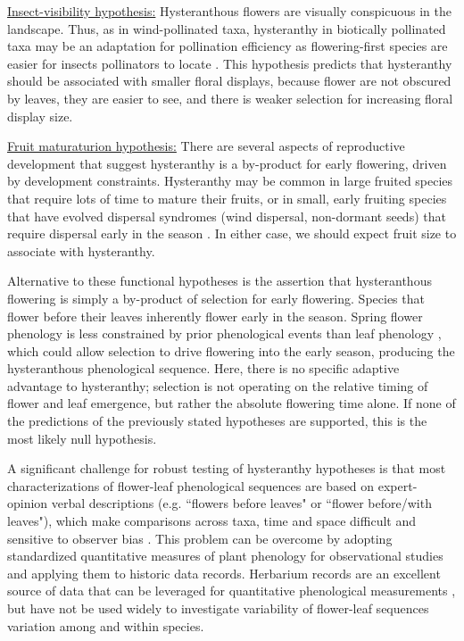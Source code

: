 \documentclass{article}[11pt]
\begin{document}
\underline{Insect-visibility hypothesis:} Hysteranthous flowers are visually conspicuous in the landscape. Thus, as in wind-pollinated taxa, hysteranthy in biotically pollinated taxa may be an adaptation for pollination efficiency as flowering-first species are easier for insects pollinators to locate \citep{Janzen1967}. This hypothesis predicts that hysteranthy should be associated with smaller floral displays, because flower are not obscured by leaves, they are easier to see, and there is weaker selection for increasing floral display size. 

\underline{Fruit maturaturion hypothesis:} There are several aspects of reproductive development that suggest hysteranthy is a by-product for early flowering, driven by development constraints. Hysteranthy may be common in large fruited species that require lots of time to mature their fruits, or in small, early fruiting species that have evolved dispersal syndromes (wind dispersal, non-dormant seeds) that require dispersal early in the season \citep{Primack1987}. In either case, we should expect fruit size to associate with hysteranthy.

Alternative to these functional hypotheses is the assertion that hysteranthous flowering is simply a by-product of selection for early flowering. Species that flower before their leaves inherently flower early in the season. Spring flower phenology is less constrained by prior phenological events than leaf phenology \citep{Savage2019}, which could allow selection to drive flowering into the early season, producing the hysteranthous phenological sequence. Here, there is no specific adaptive advantage to hysteranthy;  selection is not operating on the relative timing of flower and leaf emergence, but rather the absolute flowering time alone. If none of the predictions of the previously stated hypotheses are supported, this is the most likely null hypothesis.

\noindent A significant challenge for robust testing of hysteranthy hypotheses is that most characterizations of flower-leaf phenological sequences are based on expert-opinion verbal descriptions (e.g. ``flowers before leaves" or ``flower before/with leaves"), which make comparisons across taxa, time and space difficult and sensitive to observer bias  \citep[see;][]{Buonaiuto2020}. This problem can be overcome by adopting standardized quantitative measures of plant phenology for observational studies and applying them to historic data records. Herbarium records are an excellent source of data that can be leveraged for quantitative phenological measurements \citep{Willis2017}, but have not be used widely to investigate variability of flower-leaf sequences variation among and within species.
\end{document}

